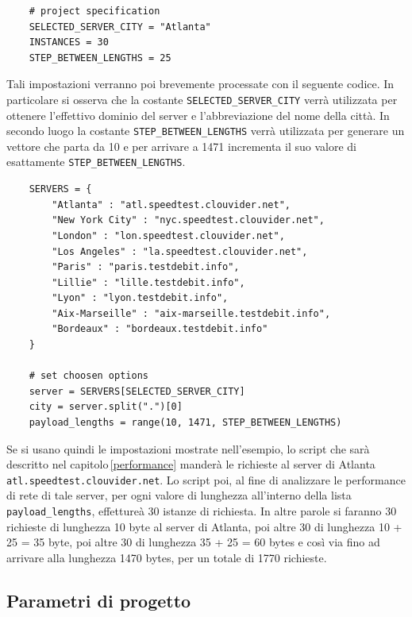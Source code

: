 \begin{lstlisting}
    # project specification
    SELECTED_SERVER_CITY = "Atlanta"
    INSTANCES = 30
    STEP_BETWEEN_LENGTHS = 25
\end{lstlisting}

\noindent Tali impostazioni verranno poi brevemente processate con il seguente codice. In particolare si osserva che la costante \texttt{SELECTED\_SERVER\_CITY} verrà utilizzata per ottenere l'effettivo dominio del server e l'abbreviazione del nome della città. In secondo luogo la costante \texttt{STEP\_BETWEEN\_LENGTHS} verrà utilizzata per generare un vettore che parta da 10 e per arrivare a 1471 incrementa il suo valore di esattamente \texttt{STEP\_BETWEEN\_LENGTHS}.

\begin{lstlisting}
    SERVERS = {
        "Atlanta" : "atl.speedtest.clouvider.net",
        "New York City" : "nyc.speedtest.clouvider.net", 
        "London" : "lon.speedtest.clouvider.net", 
        "Los Angeles" : "la.speedtest.clouvider.net", 
        "Paris" : "paris.testdebit.info", 
        "Lillie" : "lille.testdebit.info", 
        "Lyon" : "lyon.testdebit.info", 
        "Aix-Marseille" : "aix-marseille.testdebit.info", 
        "Bordeaux" : "bordeaux.testdebit.info"
    }

    # set choosen options
    server = SERVERS[SELECTED_SERVER_CITY]
    city = server.split(".")[0]
    payload_lengths = range(10, 1471, STEP_BETWEEN_LENGTHS)
\end{lstlisting}

\noindent Se si usano quindi le impostazioni mostrate nell'esempio, lo script che sarà descritto nel capitolo\,\ref{performance} manderà le richieste al server di Atlanta \texttt{atl.speedtest.clouvider.net}. Lo script poi, al fine di analizzare le performance di rete di tale server, per ogni valore di lunghezza all'interno della lista \texttt{payload\_lengths}, effettureà 30 istanze di richiesta. In altre parole si faranno 30 richieste di lunghezza 10 byte al server di Atlanta, poi altre 30 di lunghezza 10 + 25 = 35 byte, poi altre 30 di lunghezza 35 + 25 = 60 bytes e così via fino ad arrivare alla lunghezza 1470 bytes, per un totale di 1770 richieste.



\vspace{15px}\subsection{Parametri di progetto}

